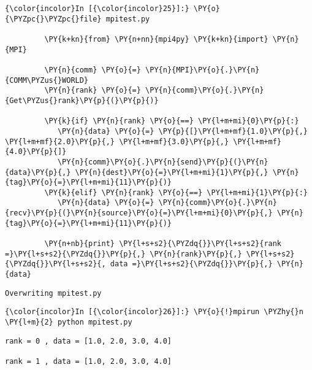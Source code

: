     \begin{Verbatim}[commandchars=\\\{\}]
{\color{incolor}In [{\color{incolor}25}]:} \PY{o}{\PYZpc{}\PYZpc{}file} mpitest.py
         
         \PY{k+kn}{from} \PY{n+nn}{mpi4py} \PY{k+kn}{import} \PY{n}{MPI}
         
         \PY{n}{comm} \PY{o}{=} \PY{n}{MPI}\PY{o}{.}\PY{n}{COMM\PYZus{}WORLD}
         \PY{n}{rank} \PY{o}{=} \PY{n}{comm}\PY{o}{.}\PY{n}{Get\PYZus{}rank}\PY{p}{(}\PY{p}{)}
         
         \PY{k}{if} \PY{n}{rank} \PY{o}{==} \PY{l+m+mi}{0}\PY{p}{:}
            \PY{n}{data} \PY{o}{=} \PY{p}{[}\PY{l+m+mf}{1.0}\PY{p}{,} \PY{l+m+mf}{2.0}\PY{p}{,} \PY{l+m+mf}{3.0}\PY{p}{,} \PY{l+m+mf}{4.0}\PY{p}{]}
            \PY{n}{comm}\PY{o}{.}\PY{n}{send}\PY{p}{(}\PY{n}{data}\PY{p}{,} \PY{n}{dest}\PY{o}{=}\PY{l+m+mi}{1}\PY{p}{,} \PY{n}{tag}\PY{o}{=}\PY{l+m+mi}{11}\PY{p}{)}
         \PY{k}{elif} \PY{n}{rank} \PY{o}{==} \PY{l+m+mi}{1}\PY{p}{:}
            \PY{n}{data} \PY{o}{=} \PY{n}{comm}\PY{o}{.}\PY{n}{recv}\PY{p}{(}\PY{n}{source}\PY{o}{=}\PY{l+m+mi}{0}\PY{p}{,} \PY{n}{tag}\PY{o}{=}\PY{l+m+mi}{11}\PY{p}{)}
             
         \PY{n+nb}{print} \PY{l+s+s2}{\PYZdq{}}\PY{l+s+s2}{rank =}\PY{l+s+s2}{\PYZdq{}}\PY{p}{,} \PY{n}{rank}\PY{p}{,} \PY{l+s+s2}{\PYZdq{}}\PY{l+s+s2}{, data =}\PY{l+s+s2}{\PYZdq{}}\PY{p}{,} \PY{n}{data}
\end{Verbatim}

    \begin{Verbatim}[commandchars=\\\{\}]
Overwriting mpitest.py

    \end{Verbatim}

    \begin{Verbatim}[commandchars=\\\{\}]
{\color{incolor}In [{\color{incolor}26}]:} \PY{o}{!}mpirun \PYZhy{}n \PY{l+m}{2} python mpitest.py
\end{Verbatim}

    \begin{Verbatim}[commandchars=\\\{\}]
rank = 0 , data = [1.0, 2.0, 3.0, 4.0]

rank = 1 , data = [1.0, 2.0, 3.0, 4.0]


    \end{Verbatim}





